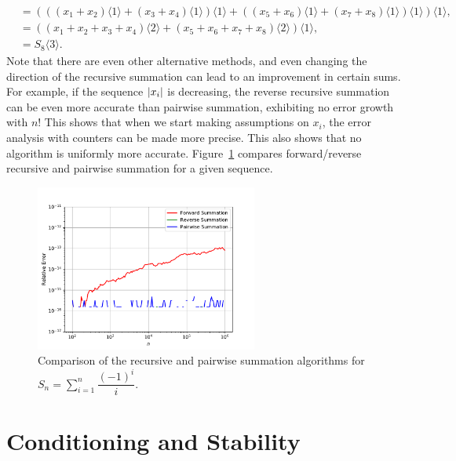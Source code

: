 \begin{example}
\begin{align*}
& = (((x_1+x_2)\langle1\rangle + (x_3+x_4)\langle1\rangle)\langle1\rangle + ((x_5+x_6)\langle1\rangle + (x_7+x_8)\langle1\rangle)\langle1\rangle)\langle1\rangle,\\
& = ((x_1+x_2+x_3+x_4)\langle2\rangle + (x_5+x_6+x_7+x_8)\langle2\rangle)\langle1\rangle,\\
& = S_8\langle3\rangle.
\end{align*}
Note that there are even other alternative methods, and even changing the direction of the recursive summation can lead to an improvement in certain sums. For example, if the sequence $\left|{x_i}\right|$ is decreasing, the reverse recursive summation can be even more accurate than pairwise summation, exhibiting no error growth with $n$! This shows that when we start making assumptions on $x_i$, the error analysis with counters can be made more precise. This also shows that no algorithm is uniformly more accurate. Figure~\ref{figure:summation} compares forward/reverse recursive and pairwise summation for a given sequence.
\begin{figure}[htbp]
\begin{center}
\includegraphics[width=0.65\textwidth]{summation}
\caption{Comparison of the recursive and pairwise summation algorithms for $\displaystyle S_n = \sum_{i=1}^n\dfrac{(-1)^i}{i}$.}
\label{figure:summation}
\end{center}
\end{figure}
\end{example}

\section{Conditioning and Stability}

